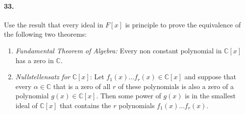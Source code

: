 \documentclass[10pt,a4paper]{article}
\begin{document}
\paragraph{33.} Use the result that every ideal in $F[x]$ is principle to prove the equivalence of the following two theorems:
\begin{enumerate}
\item \textit{Fundamental Theorem of Algebra:} Every non constant polynomial in $\mathbb{C}[x]$ has a zero in $\mathbb{C}$.
\item \textit{Nullstellensatz for} $\mathbb{C}[x]$: Let $f_1(x) \dots f_r(x) \in \mathbb{C}[x]$ and suppose that every $\alpha \in \mathbb{C}$ that is a zero of all $r$ of these polynomials is also a zero of a polynomial $g(x) \in \mathbb{C}[x]$. Then some power of $g(x)$ is in the smallest ideal of $\mathbb{C}[x]$ that contains the $r$ polynomials $f_1(x) \dots f_r(x)$. 
\end{enumerate}
\end{document}
